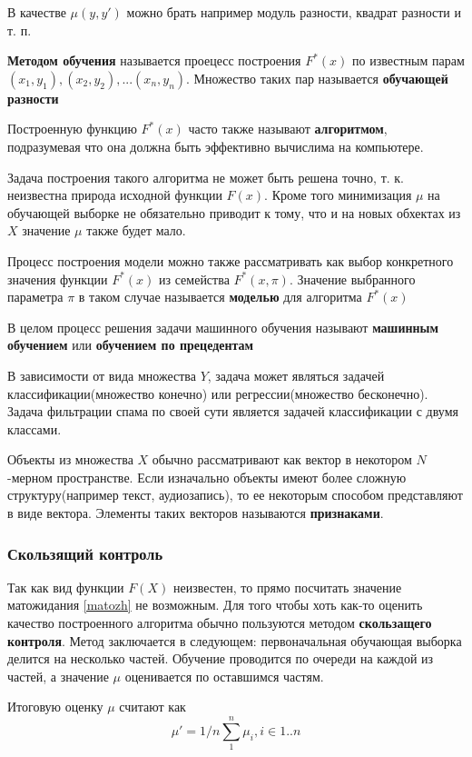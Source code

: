 В качестве $\mu(y, y')$ можно брать например модуль разности, квадрат разности и т. п.

\textbf{Методом обучения} называется проецесс построения $F^*(x)$ по известным парам $(x_1, y_1), (x_2, y_2), ... (x_n, y_n)$. Множество таких пар называется \textbf{обучающей разности}

Построенную функцию $F^*(x)$ часто также называют \textbf{алгоритмом}, подразумевая что она должна быть эффективно вычислима на компьютере.

Задача построения такого алгоритма не может быть решена точно, т. к. неизвестна природа исходной функции $F(x)$. Кроме того минимизация $\mu$ на обучающей выборке не обязательно приводит к тому, что и на новых обхектах из $X$ значение $\mu$ также будет мало.

Процесс построения модели можно также рассматривать как выбор конкретного значения функции $F^*(x)$ из семейства $F^*(x, \pi)$. Значение выбранного параметра $\pi$ в таком случае называется \textbf{моделью} для алгоритма
$F^*(x)$

В целом процесс решения задачи машинного обучения называют \textbf{машинным обучением} или \textbf{обучением по прецедентам}

В зависимости от вида множества $Y$, задача может являться задачей классификации(множество конечно) или регрессии(множество бесконечно).
Задача фильтрации спама по своей сути является задачей классификации с двумя классами.

Объекты из множества $X$ обычно рассматривают как вектор в некотором $N$-мерном пространстве. Если изначально объекты имеют более сложную структуру(например текст, аудиозапись), то ее некоторым способом представляют в виде вектора. Элементы таких векторов называются \textbf{признаками}.

\subsubsection{Скользящий контроль}
Так как вид функции $F(X)$  неизвестен, то прямо посчитать значение матожидания \ref{matozh} не возможным. Для того чтобы хоть как-то оценить качество построенного алгоритма обычно пользуются методом \textbf{скользащего контроля}. Метод заключается в следующем: первоначальная обучающая выборка делится на несколько частей. Обучение проводится по очереди на каждой из частей, а значение $\mu$ оценивается по оставшимся частям.

Итоговую оценку $\mu$ считают как
\begin{equation}
\mu' = 1/n\sum_1^n{\mu_i}, i \in 1..n
\end{equation}

